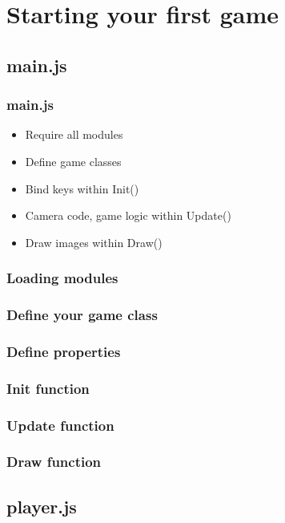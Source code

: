 \documentclass[red]{beamer}
\begin{document}
\section{Starting your first game}
\subsection{main.js}
\begin{frame}
    \frametitle{main.js}
    \begin{itemize}
        \item<1-> Require all modules
        \item<2-> Define game classes
        \item<3-> Bind keys within Init()
        \item<4-> Camera code, game logic within Update()
        \item<5-> Draw images within Draw()
    \end{itemize}
\end{frame}

\begin{frame}
    \frametitle{Loading modules}
        \lstlllll
\end{frame}

\begin{frame}
    \frametitle{Define your game class}
        \lstllllll

\end{frame}

\begin{frame}
    \frametitle{Define properties}
        \lstlllllll
\end{frame}

\begin{frame}
    \frametitle{Init function}
        \lstllllllll
\end{frame}

\begin{frame}
    \frametitle{Update function}
        \lstlllllllll
\end{frame}

\begin{frame}
    \frametitle{Draw function}
        \lstllllllllll
\end{frame}

\subsection{player.js}
\begin{frame}
\end{frame}
\end{document}
